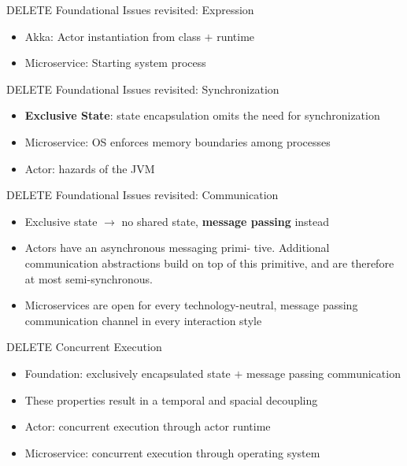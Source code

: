 \documentclass{beamer}
\newcommand{\pdfnote}[1]{\marginnote{\pdfcomment[icon=note]{#1}}}
\begin{document}
\begin{frame}{DELETE Foundational Issues revisited: Expression}

\begin{itemize}
  \item Akka: Actor instantiation from class $+$ runtime
  \item Microservice: Starting system process
\end{itemize}

\end{frame}


\begin{frame}{DELETE Foundational Issues revisited: Synchronization}

\begin{itemize}
  \item \textbf{Exclusive State}: state encapsulation omits the need for synchronization
  \item Microservice: OS enforces memory boundaries among processes
  \item Actor: hazards of the JVM
\end{itemize}

\end{frame}


\begin{frame}{DELETE Foundational Issues revisited: Communication}

\begin{itemize}
  \item Exclusive state $\rightarrow$ no shared state, \textbf{message passing} instead 
  \item Actors have an asynchronous messaging primi- tive. Additional communication abstractions build on top of this primitive, and are therefore at most semi-synchronous.
  \item Microservices are open for every technology-neutral, message passing communication channel in every interaction style
\end{itemize}

\end{frame}


\begin{frame}{DELETE Concurrent Execution}

\pdfnote{remember to say hello}

\begin{itemize}
  \item Foundation: exclusively encapsulated state $+$ message passing communication
  \item These properties result in a temporal and spacial decoupling
  \item Actor: concurrent execution through actor runtime
  \item Microservice: concurrent execution through operating system
\end{itemize}

\end{frame}
\end{document}
